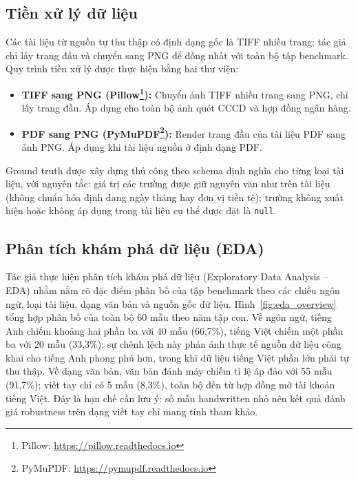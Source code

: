 ﻿\documentclass[12pt]{report}
\begin{document}
\subsection{Tiền xử lý dữ liệu}\label{sec:preprocessing}

Các tài liệu từ nguồn tự thu thập có định dạng gốc là TIFF nhiều trang; tác giả chỉ lấy trang
đầu và chuyển sang PNG để đồng nhất với toàn bộ tập benchmark. Quy trình tiền xử lý được thực
hiện bằng hai thư viện:

\begin{itemize}
    \item \textbf{TIFF sang PNG (Pillow\footnote{Pillow: \url{https://pillow.readthedocs.io}}):} Chuyển ảnh TIFF nhiều trang sang PNG, chỉ lấy trang đầu. Áp dụng cho toàn bộ ảnh quét CCCD và hợp đồng ngân hàng.
    \item \textbf{PDF sang PNG (PyMuPDF\footnote{PyMuPDF: \url{https://pymupdf.readthedocs.io}}):} Render trang đầu của tài liệu PDF sang ảnh PNG. Áp dụng khi tài liệu nguồn ở định dạng PDF.
\end{itemize}

Ground truth được xây dựng thủ công theo schema định nghĩa cho từng loại tài liệu, với nguyên tắc: giá trị các trường được giữ nguyên văn như trên tài liệu (không chuẩn hóa định dạng ngày tháng hay đơn vị tiền tệ); trường không xuất hiện hoặc không áp dụng trong tài liệu cụ thể được đặt là \texttt{null}.

\subsection{Phân tích khám phá dữ liệu (EDA)}\label{sec:eda}

Tác giả thực hiện phân tích khám phá dữ liệu (Exploratory Data Analysis -- EDA) nhằm nắm rõ
đặc điểm phân bố của tập benchmark theo các chiều ngôn ngữ, loại tài liệu, dạng văn bản và
nguồn gốc dữ liệu. Hình~\ref{fig:eda_overview} tổng hợp phân bố của toàn bộ 60 mẫu theo năm
tập con. Về ngôn ngữ, tiếng Anh chiếm khoảng hai phần ba với 40 mẫu (66,7\%), tiếng Việt chiếm
một phần ba với 20 mẫu (33,3\%); sự chênh lệch này phản ánh thực tế nguồn dữ liệu công khai cho
tiếng Anh phong phú hơn, trong khi dữ liệu tiếng Việt phần lớn phải tự thu thập. Về dạng văn
bản, văn bản đánh máy chiếm tỉ lệ áp đảo với 55 mẫu (91,7\%); viết tay
chỉ có 5 mẫu (8,3\%), toàn bộ đến từ hợp đồng mở tài khoản tiếng Việt. Đây là hạn chế cần lưu
ý: số mẫu handwritten nhỏ nên kết quả đánh giá robustness trên dạng viết tay chỉ mang tính
tham khảo.
\end{document}
